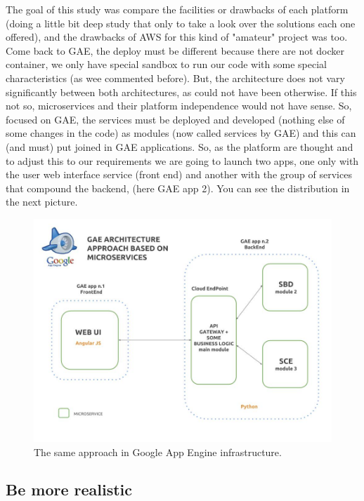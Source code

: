 \noindent The goal of this study was compare the facilities or drawbacks of each platform
(doing a little bit deep study that only to take a look over the solutions each
one offered), and the drawbacks of AWS for this kind of "amateur" project was too.
\intro
Come back to GAE, the deploy must be different because there are not docker
container, we only have special sandbox to run our code with some special
characteristics (as wee commented before). But, the architecture does not vary
significantly between both architectures, as could not have been otherwise.
If this not so, microservices and their platform independence would not have sense.
\intro
So, focused on GAE, the services must be deployed and developed (nothing else of
some changes in the code) as modules (now called services by GAE) and this can
(and must) put joined in GAE applications. So, as the platform are thought and
to adjust this to our requirements we are going to launch two apps, one only with
the user web interface service (front end) and another with the group of services
that compound the backend, (here GAE app 2).
You can see the distribution in the next picture.

\begin{figure}[H]
  \includegraphics[scale=0.35]{img/graphics/gae_approach.jpg}
  \centering
  \caption{The same approach in Google App Engine infrastructure.}
\end{figure}


\subsection{Be more realistic}

